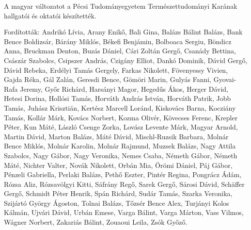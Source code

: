 {
A magyar változatot a Pécsi Tudományegyetem Természettudományi Karának hallgatói és oktatói készítették.

Fordították:
Andrikó Lívia, Arany Enikő,
Bali Gina, Balázs Bálint Balázs, Bank Bence Boldizsár, Bárány Miklós,
Békefi Benjámin, Bolboaca Sergiu, Böndicz Anna, Bruckman Denton, Buzás Dániel,
Cári Zoltán Gergő, Csanády Bettina, Császár Szabolcs, Csipszer András, Czigány Elliot,
Dankó Dominik, Dávid Gergő, Dávid Rebeka, Erdélyi Tamás Gergely,
Farkas Nikolett, Fövenyessy Vivien,
Gajda Réka, Gál Zalán, Geresdi Bence, Gömöri Marin, Gulyás Fanni, Gyovai-Rafa Jeremy, Győr Richárd,
Harsányi Magor, Hegedűs Ákos, Herger Dávid, Hetesi Dorina, Hollósi Tamás, Horváth András István, Horváth Patrik,
Jobb Tamás, Juhász Krisztián,
Kertész Marcell Loránd, Kiskovács Barna, Kocziány Tamás, Kollár Márk, Kovács Norbert, Kozma Olivér, Kövecses Ferenc, Krepler Péter, Kun Máté,
László Csenge Zorka, Lovász Levente Márk,
Magyar Arnold, Martin Dávid, Marton Balázs, Máté Dávid, Mischl-Ruzsik Barbara, Molnár Bence Miklós, Molnár Karolin, Molnár Rajmund, Muzsek Balázs,
Nagy Attila Szabolcs, Nagy Gábor, Nagy Veronika, Nemes Csaba, Németh Gábor, Németh Máté, Nichter Valter, Novák Nikolett,
Orbán Mia, Örömi Dániel,
Páj Gábor, Pénzeli Gabriella, Perlaki Balázs, Pethő Eszter, Pintér Regina, Pongrácz Ádám,
Rózsa Aliz, Rózsavölgyi Kitti,
Sáfrány Regő, Sarek Gergő, Sárosi Dávid, Schäffer Gergő, Schmidt Péter Henrik, Spán Richárd, Sudár Tamás,
Szarka Veronika, Szijártó György Ágoston,
Tolnai Balázs, Tőzsér Bence Alex, Turjányi Kolos Kálmán, Ujvári Dávid, Urbán Emese,
Varga Bálint, Varga Márton, Vass Vilmos, Wágner Norbert, Zakariás Bálint, Zouaoui Leila, Zsók Győző.
}